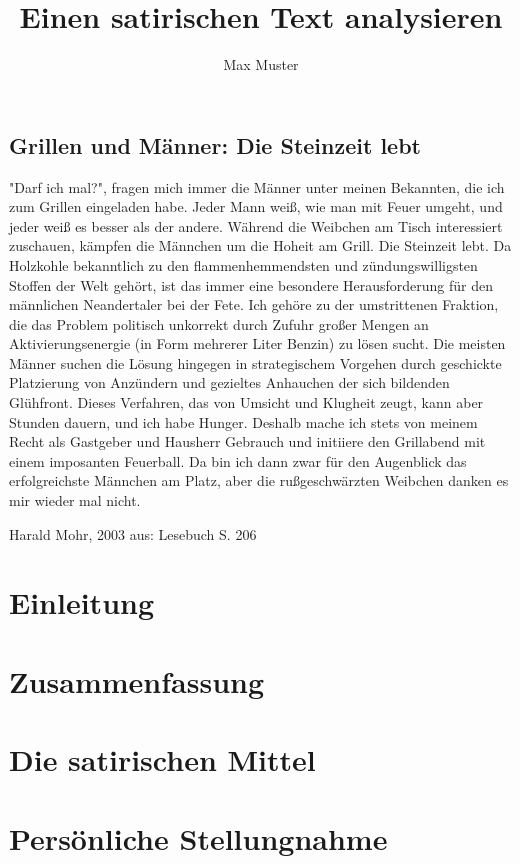 \documentclass[12pt,a4paper]{scrartcl}
\begin{document}
 
\author{Max Muster} 
\title{Einen satirischen Text analysieren} 
\maketitle 
\modulolinenumbers[5]
%
\begin{linenumbers}
\section{Grillen und Männer: Die Steinzeit lebt} 
"Darf ich mal?", fragen mich immer die Männer unter meinen Bekannten, die ich zum Grillen eingeladen habe. Jeder Mann weiß, wie man mit Feuer umgeht, und jeder weiß es besser als der andere. Während die Weibchen am Tisch interessiert zuschauen, kämpfen die Männchen um die Hoheit am Grill. Die Steinzeit lebt. Da Holzkohle bekanntlich zu den flammenhemmendsten und zündungswilligsten Stoffen der Welt gehört, ist das immer eine besondere Herausforderung für den männlichen Neandertaler bei der Fete. Ich gehöre zu der umstrittenen Fraktion, die das Problem politisch unkorrekt durch Zufuhr großer Mengen an Aktivierungsenergie (in Form mehrerer Liter Benzin) zu lösen sucht. Die meisten Männer suchen die Lösung hingegen in strategischem Vorgehen durch geschickte Platzierung von Anzündern und gezieltes Anhauchen der sich bildenden Glühfront. Dieses Verfahren, das von Umsicht und Klugheit zeugt, kann aber Stunden dauern, und ich habe Hunger. Deshalb mache ich stets von meinem Recht als Gastgeber und Hausherr Gebrauch und initiiere den Grillabend mit einem imposanten Feuerball. Da bin ich dann zwar für den Augenblick das erfolgreichste Männchen am Platz, aber die rußgeschwärzten Weibchen danken es mir wieder mal nicht.\\
\end{linenumbers}
Harald Mohr, 2003 aus: Lesebuch S. 206
\begin{spacing}{2}
\section{Einleitung}

\section{Zusammenfassung}

\section{Die satirischen Mittel}


\section{Persönliche Stellungnahme}

\end{spacing}
\end{document}
